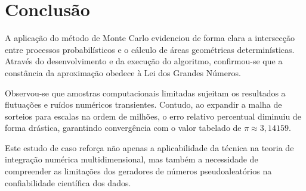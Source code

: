 \chapter{Conclusão}\label{cap:conclusao}

A aplicação do método de Monte Carlo evidenciou de forma clara a intersecção entre processos probabilísticos e o cálculo de áreas geométricas determinísticas. Através do desenvolvimento e da execução do algoritmo, confirmou-se que a constância da aproximação obedece à Lei dos Grandes Números. 

Observou-se que amostras computacionais limitadas sujeitam os resultados a flutuações e ruídos numéricos transientes. Contudo, ao expandir a malha de sorteios para escalas na ordem de milhões, o erro relativo percentual diminuiu de forma drástica, garantindo convergência com o valor tabelado de $\pi \approx 3,14159$. 

Este estudo de caso reforça não apenas a aplicabilidade da técnica na teoria de integração numérica multidimensional, mas também a necessidade de compreender as limitações dos geradores de números pseudoaleatórios na confiabilidade científica dos dados.